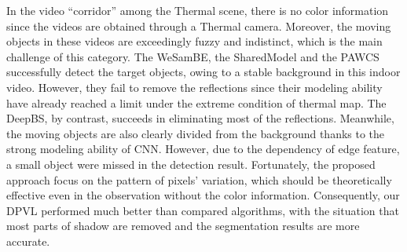 \documentclass[journal]{IEEEtran}
\begin{document}
In the video “corridor” among the Thermal scene, there is no color information since the videos are obtained through a Thermal camera. 
Moreover, the moving objects in these videos are exceedingly fuzzy and indistinct, which is the main challenge of this category. 
The WeSamBE, the SharedModel and the PAWCS successfully detect the target objects, owing to a stable background in this indoor video. 
However, they fail to remove the reflections since their modeling ability have already reached a limit under the extreme condition of thermal map. 
The DeepBS, by contrast, succeeds in eliminating most of the reflections. 
Meanwhile, the moving objects are also clearly divided from the background thanks to the strong modeling ability of CNN. 
However, due to the dependency of edge feature, a small object were missed in the detection result. 
Fortunately, the proposed approach focus on the pattern of pixels’ variation, which should be theoretically effective even in the observation without the color information. 
Consequently, our DPVL performed much better than compared algorithms, with the situation that most parts of shadow are removed and the segmentation results are more accurate.
\end{document}
